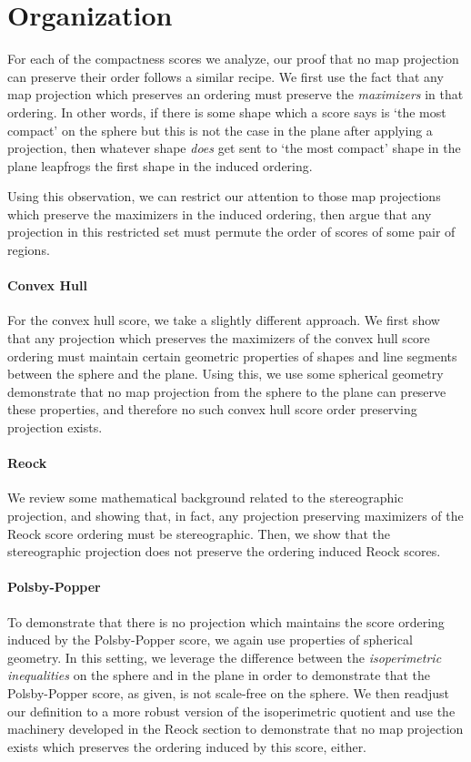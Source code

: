 \section{Organization}


For each of the compactness scores we analyze, our proof that no map
projection can preserve their order follows a similar recipe. We
first use the fact that any map projection which preserves an ordering
must preserve the \textit{maximizers} in that ordering.  In other words,
if there is some shape which a score says is `the most compact' on the sphere 
but this is not the case in the plane after applying a projection, then whatever 
shape \textit{does} get sent to `the most compact' shape in the plane leapfrogs 
the first shape in the induced ordering.

Using this observation, we can restrict our attention to those map
projections which preserve the maximizers in the induced ordering,
then argue that any projection in this restricted set must permute the
order of scores of some pair of regions.


\paragraph{Convex Hull}
For the convex hull score, we take a slightly different approach.  We first 
show that any projection which preserves the maximizers of the convex hull score 
ordering must maintain certain geometric properties of shapes and line segments 
between the sphere and the plane.  Using this, we use some spherical geometry demonstrate that no 
map projection from the sphere to the plane can preserve these properties, and therefore 
no such convex hull score order preserving projection exists.



\paragraph{Reock}
We  review some mathematical background related to 
the   stereographic projection, and showing 
that, in fact, any projection preserving maximizers 
 of the Reock score ordering must be stereographic. 
Then, we show that the  stereographic 
projection does not preserve the ordering induced Reock scores. 




\paragraph{Polsby-Popper}
To demonstrate that there is no projection which maintains the score ordering induced by the Polsby-Popper score, we again use properties of spherical geometry.  In this setting, we leverage the 
difference between the \textit{isoperimetric inequalities} on the sphere and in the plane in order to 
demonstrate that the Polsby-Popper score, as given, is not scale-free on the sphere.  We then readjust 
our definition to a more robust version of the isoperimetric quotient and use the machinery developed 
in the Reock section to demonstrate that no map projection exists which preserves the ordering induced by this score, either.

